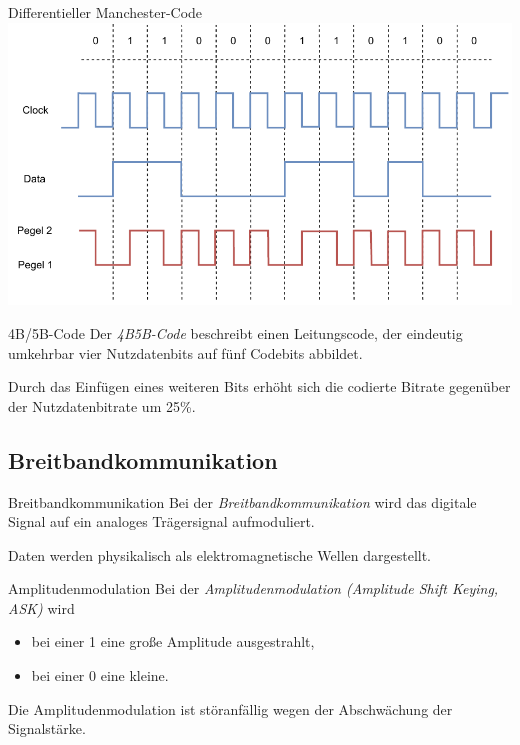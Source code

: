 \begin{example}{Differentieller Manchester-Code}
    \centering
    \includegraphics[width=.9\textwidth]{includes/figures/example_differentieller_manchester.pdf}
\end{example}

\begin{defi}{4B/5B-Code}
    Der \emph{4B5B-Code} beschreibt einen Leitungscode, der eindeutig umkehrbar vier Nutzdatenbits auf fünf Codebits abbildet.

    Durch das Einfügen eines weiteren Bits erhöht sich die codierte Bitrate gegenüber der Nutzdatenbitrate um 25\%.
\end{defi}

\subsection{Breitbandkommunikation}

\begin{defi}{Breitbandkommunikation}
    Bei der \emph{Breitbandkommunikation} wird das digitale Signal auf ein analoges Trägersignal aufmoduliert.

    Daten werden physikalisch als elektromagnetische Wellen dargestellt.
\end{defi}

\begin{defi}{Amplitudenmodulation}
    Bei der \emph{Amplitudenmodulation (Amplitude Shift Keying, ASK)} wird
    \begin{itemize}
        \item bei einer 1 eine große Amplitude ausgestrahlt,
        \item bei einer 0 eine kleine.
    \end{itemize}

    Die Amplitudenmodulation ist störanfällig wegen der Abschwächung der Signalstärke.
\end{defi}

